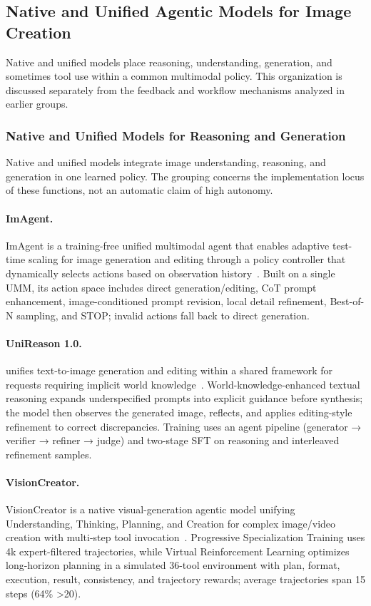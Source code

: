 \subsection{Native and Unified Agentic Models for Image Creation}
Native and unified models place reasoning, understanding, generation, and sometimes tool use within a common multimodal policy. This organization is discussed separately from the feedback and workflow mechanisms analyzed in earlier groups.

\subsubsection{Native and Unified Models for Reasoning and Generation}
Native and unified models integrate image understanding, reasoning, and generation in one learned policy. The grouping concerns the implementation locus of these functions, not an automatic claim of high autonomy.

\paragraph{ImAgent.}
ImAgent is a training-free unified multimodal agent that enables adaptive test-time scaling for image generation and editing through a policy controller that dynamically selects actions based on observation history~\cite{avg251111483}. Built on a single UMM, its action space includes direct generation/editing, CoT prompt enhancement, image-conditioned prompt revision, local detail refinement, Best-of-N sampling, and STOP; invalid actions fall back to direct generation. 

\paragraph{UniReason 1.0.}
 unifies text-to-image generation and editing within a shared framework for requests requiring implicit world knowledge~\cite{avg260202437}. World-knowledge-enhanced textual reasoning expands underspecified prompts into explicit guidance before synthesis; the model then observes the generated image, reflects, and applies editing-style refinement to correct discrepancies. Training uses an agent pipeline (generator → verifier → refiner → judge) and two-stage SFT on reasoning and interleaved refinement samples.

\paragraph{VisionCreator.}
VisionCreator is a native visual-generation agentic model unifying Understanding, Thinking, Planning, and Creation for complex image/video creation with multi-step tool invocation~\cite{avg260302681}. Progressive Specialization Training uses 4k expert-filtered trajectories, while Virtual Reinforcement Learning optimizes long-horizon planning in a simulated 36-tool environment with plan, format, execution, result, consistency, and trajectory rewards; average trajectories span 15 steps (64\% >20).




